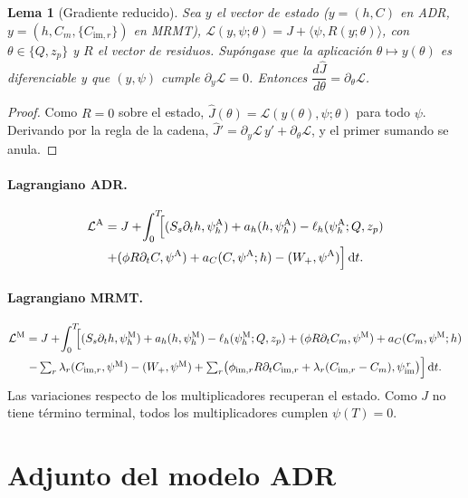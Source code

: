 \documentclass[11pt]{article}
\numberwithin{equation}{section}
\theoremstyle{plain}
\newtheorem{lemma}[theorem]{Lema}
\theoremstyle{definition}
\theoremstyle{remark}
\newcommand{\im}{\mathrm{im}}
\newcommand{\pA}{\psi^{\mathrm A}}          %
\newcommand{\pM}{\psi^{\mathrm M}}          %
\newcommand{\pim}{\psi_{\im}}               %
\newcommand{\phA}{\psi_h^{\mathrm A}}       %
\newcommand{\phM}{\psi_h^{\mathrm M}}       %
\newcommand{\dd}{\,\mathrm d}
\begin{document}
\begin{lemma}[Gradiente reducido]\label{lem:grad}
Sea $y$ el vector de estado ($y=(h,C)$ en ADR, $y=(h,C_m,\{C_{\im,r}\})$ en MRMT), $\mathcal L(y,\psi;\theta)=J+\langle\psi,R(y;\theta)\rangle$, con $\theta\in\{Q,z_p\}$ y $R$ el vector de residuos. Supóngase que la aplicación
$\theta\mapsto y(\theta)$ es diferenciable y que $(y,\psi)$ cumple $\partial_y\mathcal L=0$. Entonces
$\dfrac{d\hat J}{d\theta}=\partial_\theta\mathcal L$.
\end{lemma}
\begin{proof}
Como $R=0$ sobre el estado, $\hat J(\theta)=\mathcal L(y(\theta),\psi;\theta)$ para todo $\psi$. Derivando por la regla de la cadena,
$\hat J'=\partial_y\mathcal L\,y'+\partial_\theta\mathcal L$, y el primer sumando se anula.
\end{proof}

\paragraph{Lagrangiano ADR.}
\begin{multline}
\mathcal{L}^{\rm A}=J+\!\int_0^T\!\!\Bigl[(S_s\partial_th,\phA)+a_h(h,\phA)-\ell_h(\phA;Q,z_p)\\
+(\phi R\partial_tC,\pA)+a_C(C,\pA;h)-(W_+,\pA)\Bigr]\dd t .
\label{eq:L_ADR}
\end{multline}

\paragraph{Lagrangiano MRMT.}
\begin{multline}
\mathcal{L}^{\rm M}=J+\!\int_0^T\!\!\Bigl[(S_s\partial_th,\phM)+a_h(h,\phM)-\ell_h(\phM;Q,z_p)
+(\phi R\partial_tC_m,\pM)+a_C(C_m,\pM;h)\\
-\textstyle\sum_r\lambda_r(C_{\im,r},\pM)-(W_+,\pM)
+\sum_r\bigl(\phi_{\im,r}R\partial_tC_{\im,r}+\lambda_r(C_{\im,r}-C_m),\pim^{\,r}\bigr)\Bigr]\dd t .
\label{eq:L_MRMT}
\end{multline}
Las variaciones respecto de los multiplicadores recuperan el estado. Como $J$ no tiene término terminal, todos los
multiplicadores cumplen $\psi(T)=0$.

\section{Adjunto del modelo ADR}
\label{sec:adj_ADR}
\end{document}
